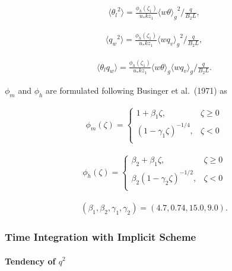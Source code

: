 \begin{eqnarray}\langle {\theta_l}^2\rangle=\frac{\phi_h\left(\zeta_1\right)}{u_*kz_1}{\langle w\theta \rangle_g}^2 \bigg/ \frac{q}{B_2L}, \end{eqnarray}

\begin{eqnarray}\langle {q_w}^2\rangle=\frac{\phi_h\left(\zeta_1\right)}{u_*kz_1}{\langle wq_v\rangle_g}^2 \bigg/ \frac{q}{B_2L}, \end{eqnarray}

\begin{eqnarray}\langle \theta_lq_w\rangle=\frac{\phi_h\left(\zeta_1\right)}{u_*kz_1}\langle w\theta \rangle_g\langle wq_v \rangle_g \bigg/ \frac{q}{B_2L}. \end{eqnarray}

\(\phi_m\) and \(\phi_h\) are formulated following Businger et al.~(1971) as

\begin{eqnarray}
\phi_m(\zeta)=\left\{
    \begin{array}{lr}
      1+\beta_1\zeta, &\zeta\ge 0\\
      \left(1-\gamma_1\zeta\right)^{-1/4}, &\zeta< 0\\
    \end{array}
  \right.
\end{eqnarray}

\begin{eqnarray}
\phi_h(\zeta)=\left\{
    \begin{array}{lr}
      \beta_2+\beta_1\zeta, &\zeta\ge 0\\
      \beta_2\left(1-\gamma_2\zeta\right)^{-1/2}, &\zeta< 0\\
    \end{array}
  \right.
\end{eqnarray}

\begin{eqnarray}(\beta_1,\beta_2,\gamma_1,\gamma_2)=(4.7,0.74,15.0,9.0).\end{eqnarray}

\hypertarget{time-integration-with-implicit-scheme}{%
\subsubsection{Time Integration with Implicit Scheme}\label{time-integration-with-implicit-scheme}}

\hypertarget{tendency-of-q2}{%
\paragraph{\texorpdfstring{Tendency of \(q^2\)}{Tendency of q\^{}2}}\label{tendency-of-q2}}

